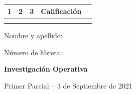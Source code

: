 \documentclass[a4paper,oneside,12pt]{amsart}
\newcommand{\nombremateria}
{Investigaci\'on Operativa}
\newcommand{\numeroparcial}
    { Primer Parcial }
\newcommand{\fecha}
    {3 de Septiembre de 2021}
\begin{document}
\hfill \hfill
\begin{tabular}[c]{|c|c|c|c|c|}
\hline 
1 & 2 & 3 &  Calificaci\'on \\ \hline \hline
\hspace{1.2 cm} & \hspace{1.2 cm} & \hspace{1.2 cm} & \hspace{1.5 cm} \\
\hspace{1.2 cm} & \hspace{1.2 cm} & \hspace{1.2 cm} & \hspace{1.5 cm} \\ \hline

\end{tabular}

\vspace{-1cm}

\noindent Nombre y apellido:

\vspace{0.2cm}

\noindent Número de libreta:

\noindent \hrulefill 

\smallskip
\renewcommand{\baselinestretch}{1.1}

\begin{center}
	\large \textbf{\nombremateria} 
	
	\numeroparcial -- \fecha
\end{center}

\vspace{.6cm}
\renewcommand{\theenumi}{\textbf{\arabic{enumi}}}

\end{document}
